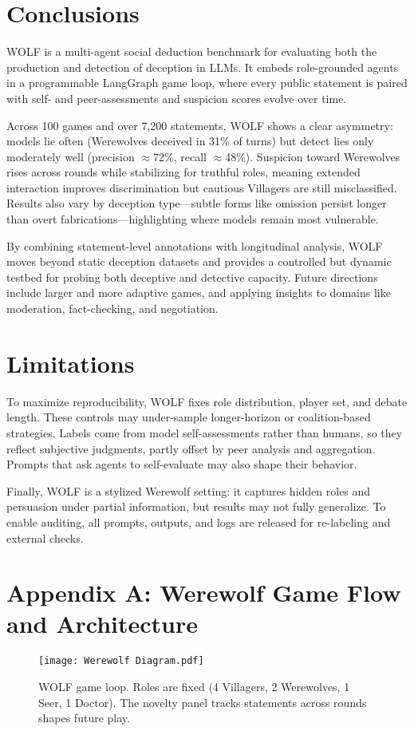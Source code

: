 \documentclass{article}
\begin{document}
\section{Conclusions}
WOLF is a multi-agent social deduction benchmark for evaluating both the production and detection of deception in LLMs. It embeds role-grounded agents in a programmable LangGraph game loop, where every public statement is paired with self- and peer-assessments and suspicion scores evolve over time.  

Across 100 games and over 7,200 statements, WOLF shows a clear asymmetry: models lie often (Werewolves deceived in 31\% of turns) but detect lies only moderately well (precision $\approx$72\%, recall $\approx$48\%). Suspicion toward Werewolves rises across rounds while stabilizing for truthful roles, meaning extended interaction improves discrimination but cautious Villagers are still misclassified. Results also vary by deception type—subtle forms like omission persist longer than overt fabrications—highlighting where models remain most vulnerable.  

By combining statement-level annotations with longitudinal analysis, WOLF moves beyond static deception datasets and provides a controlled but dynamic testbed for probing both deceptive and detective capacity. Future directions include larger and more adaptive games, and applying insights to domains like moderation, fact-checking, and negotiation.

\section{Limitations}
To maximize reproducibility, WOLF fixes role distribution, player set, and debate length. These controls may under-sample longer-horizon or coalition-based strategies. Labels come from model self-assessments rather than humans, so they reflect subjective judgments, partly offset by peer analysis and aggregation. Prompts that ask agents to self-evaluate may also shape their behavior.  

Finally, WOLF is a stylized Werewolf setting: it captures hidden roles and persuasion under partial information, but results may not fully generalize. To enable auditing, all prompts, outputs, and logs are released for re-labeling and external checks.


\newpage
\begingroup
\setlength{\bibhang}{1.5em}
\setlength{\bibsep}{2pt}
\small


\endgroup

\appendix
\newpage
\section{Appendix A: Werewolf Game Flow and Architecture}
\begin{figure}[h]
\centering
\texttt{[image: Werewolf Diagram.pdf]}

\caption{WOLF game loop. Roles are fixed (4 Villagers, 2 Werewolves, 1 Seer, 1 Doctor). 
The novelty panel tracks statements across rounds shapes future play.}
\label{fig: Werewolf Game Flow}
\end{figure}
\end{document}
